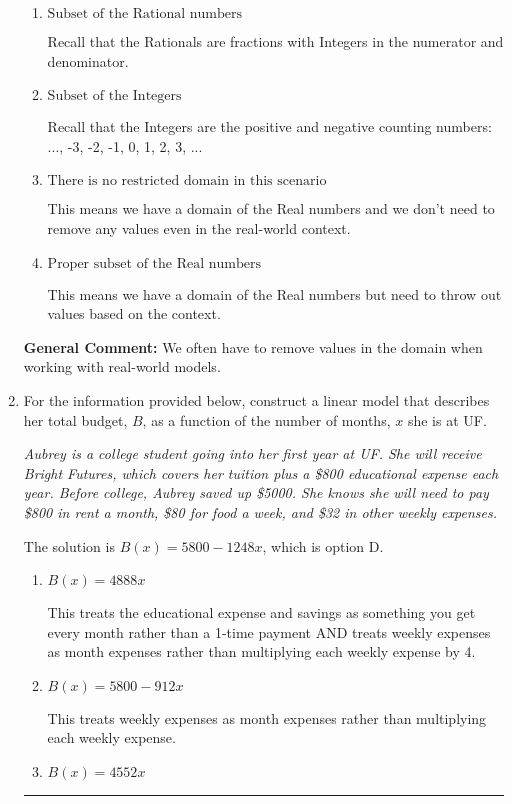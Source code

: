 \documentclass{extbook}[14pt]
\newcommand{\litem}[1]{\item #1

\rule{\textwidth}{0.4pt}}
\begin{document}
\begin{enumerate}
{\begin{enumerate}[label=\Alph*.]
Recall that the Naturals are the counting numbers: 1, 2, 3, ...
\item \( \text{Subset of the Rational numbers} \)

Recall that the Rationals are fractions with Integers in the numerator and denominator.
\item \( \text{Subset of the Integers} \)

Recall that the Integers are the positive and negative counting numbers: ..., -3, -2, -1, 0, 1, 2, 3, ... 
\item \( \text{There is no restricted domain in this scenario} \)

This means we have a domain of the Real numbers and we don't need to remove any values even in the real-world context.
\item \( \text{Proper subset of the Real numbers} \)

This means we have a domain of the Real numbers but need to throw out values based on the context.
\end{enumerate}

\textbf{General Comment:} We often have to remove values in the domain when working with real-world models.
}
\litem{
For the information provided below, construct a linear model that describes her total budget, $B$, as a function of the number of months, $x$ she is at UF.

\begin{center}
    \textit{ Aubrey is a college student going into her first year at UF. She will receive Bright Futures, which covers her tuition plus a \$800 educational expense each year. Before college, Aubrey saved up \$5000. She knows she will need to pay \$800 in rent a month, \$80 for food a week, and \$32 in other weekly expenses. }
\end{center}
The solution is \( B(x) = 5800 - 1248 x \), which is option D.\begin{enumerate}[label=\Alph*.]
\item \( B(x) = 4888 x \)

This treats the educational expense and savings as something you get every month rather than a 1-time payment AND treats weekly expenses as month expenses rather than multiplying each weekly expense by 4.
\item \( B(x) = 5800 - 912 x \)

This treats weekly expenses as month expenses rather than multiplying each weekly expense.
\item \( B(x) = 4552 x \)


\end{enumerate}}
\end{enumerate}
\end{document}
